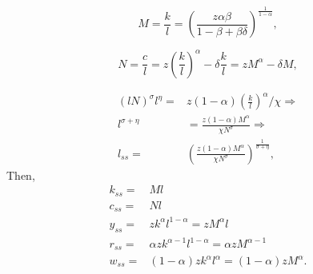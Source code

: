 \documentclass[]{article}
\begin{document}
            \begin{equation*}
                M=\frac{k}{l}=\left(\frac{z\alpha \beta}{1-\beta +\beta \delta}\right)^{\frac{1}{1-\alpha}},
            \end{equation*}

            \begin{equation*}
                N=\frac{c}{l}=z(\frac{k}{l})^{\alpha}-\delta \frac{k}{l}=zM^{\alpha}-\delta M,
            \end{equation*}

            \begin{equation*}
            \begin{split}
                (lN)^{\sigma}l^{\eta}=&
                z(1-\alpha)(\frac{k}{l})^{\alpha}/\chi\Rightarrow\\
                l^{\sigma+\eta}&=\frac{z(1-\alpha)M^{\alpha}}{\chi N^{\sigma}} \Rightarrow\\
                l_{ss}=&\left(\frac{z(1-\alpha)M^{\alpha}}{\chi N^{\sigma}}\right)^{\frac{1}{\sigma+\eta}},
            \end{split}
            \end{equation*}
            Then,
            \begin{equation*}
            \begin{split}
                k_{ss}=&Ml\\
                c_{ss}=&Nl\\
                y_{ss}=&zk^{\alpha}l^{1-\alpha}=zM^{\alpha}l\\
                r_{ss}=&\alpha zk^{\alpha-1}l^{1-\alpha}=\alpha zM^{\alpha -1}\\
                w_{ss}=&(1-\alpha)zk^{\alpha}l^{\alpha}=(1-\alpha)zM^{\alpha}.
            \end{split}
            \end{equation*}
\end{document}
